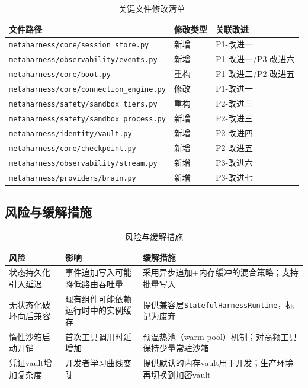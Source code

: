 \documentclass[12pt,a4paper]{ctexart}
\begin{document}
\begin{table}[H]
\centering
\caption{关键文件修改清单}\label{tab:files}
\begin{tabular}{@{}lll@{}}
\toprule
\textbf{文件路径} & \textbf{修改类型} & \textbf{关联改进} \\
\midrule
\texttt{metaharness/core/session\_store.py} & 新增 & P1-改进一 \\
\texttt{metaharness/observability/events.py} & 新增 & P1-改进一/P3-改进六 \\
\texttt{metaharness/core/boot.py} & 重构 & P1-改进二/P2-改进五 \\
\texttt{metaharness/core/connection\_engine.py} & 修改 & P1-改进一 \\
\texttt{metaharness/safety/sandbox\_tiers.py} & 重构 & P2-改进三 \\
\texttt{metaharness/safety/sandbox\_process.py} & 新增 & P2-改进三 \\
\texttt{metaharness/identity/vault.py} & 新增 & P2-改进四 \\
\texttt{metaharness/core/checkpoint.py} & 新增 & P2-改进五 \\
\texttt{metaharness/observability/stream.py} & 新增 & P3-改进六 \\
\texttt{metaharness/providers/brain.py} & 新增 & P3-改进七 \\
\bottomrule
\end{tabular}
\end{table}

\subsection{风险与缓解措施}

\begin{table}[H]
\centering
\caption{风险与缓解措施}\label{tab:risks}
\begin{tabular}{@{}p{3.5cm}p{5cm}p{5cm}@{}}
\toprule
\textbf{风险} & \textbf{影响} & \textbf{缓解措施} \\
\midrule
状态持久化引入延迟 & 事件追加写入可能降低路由吞吐量 & 采用异步追加+内存缓冲的混合策略；支持批量写入 \\
无状态化破坏向后兼容 & 现有组件可能依赖运行时中的实例缓存 & 提供兼容层\texttt{StatefulHarnessRuntime}，标记为废弃 \\
惰性沙箱启动开销 & 首次工具调用时延增加 & 预温热池（warm pool）机制；对高频工具保持少量常驻沙箱 \\
凭证vault增加复杂度 & 开发者学习曲线变陡 & 提供默认的内存vault用于开发；生产环境再切换到加密vault \\
\bottomrule
\end{tabular}
\end{table}
\end{document}
